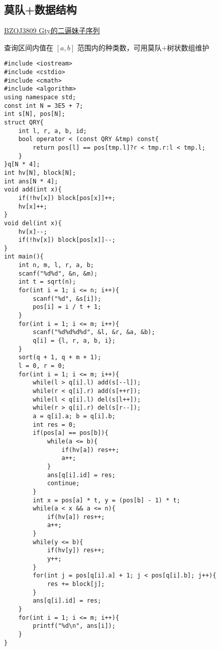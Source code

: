 \subsection{莫队+数据结构}
	\href{https://darkbzoj.tk/problem/3809}{BZOJ3809 Gty的二逼妹子序列} \par
	查询区间内值在 $[a, b]$ 范围内的种类数，可用莫队+树状数组维护
	\begin{lstlisting}
#include <iostream>
#include <cstdio>
#include <cmath>
#include <algorithm>
using namespace std;
const int N = 3E5 + 7;
int s[N], pos[N];
struct QRY{
    int l, r, a, b, id;
    bool operator < (const QRY &tmp) const{
        return pos[l] == pos[tmp.l]?r < tmp.r:l < tmp.l;
    }
}q[N * 4];
int hv[N], block[N];
int ans[N * 4];
void add(int x){
    if(!hv[x]) block[pos[x]]++;
    hv[x]++;
}
void del(int x){
    hv[x]--;
    if(!hv[x]) block[pos[x]]--;
}
int main(){
    int n, m, l, r, a, b;
    scanf("%d%d", &n, &m);
    int t = sqrt(n);
    for(int i = 1; i <= n; i++){
        scanf("%d", &s[i]);
        pos[i] = i / t + 1;
    }
    for(int i = 1; i <= m; i++){
        scanf("%d%d%d%d", &l, &r, &a, &b);
        q[i] = {l, r, a, b, i};
    }
    sort(q + 1, q + m + 1);
    l = 0, r = 0;
    for(int i = 1; i <= m; i++){
        while(l > q[i].l) add(s[--l]);
        while(r < q[i].r) add(s[++r]);
        while(l < q[i].l) del(s[l++]);
        while(r > q[i].r) del(s[r--]);
        a = q[i].a; b = q[i].b;
        int res = 0;
        if(pos[a] == pos[b]){
            while(a <= b){
                if(hv[a]) res++;
                a++;
            }
            ans[q[i].id] = res;
            continue;
        }
        int x = pos[a] * t, y = (pos[b] - 1) * t;
        while(a < x && a <= n){
            if(hv[a]) res++;
            a++;
        }
        while(y <= b){
            if(hv[y]) res++;
            y++;
        }
        for(int j = pos[q[i].a] + 1; j < pos[q[i].b]; j++){
            res += block[j];
        }
        ans[q[i].id] = res;
    }
    for(int i = 1; i <= m; i++){
        printf("%d\n", ans[i]);
    }
}\end{lstlisting}
